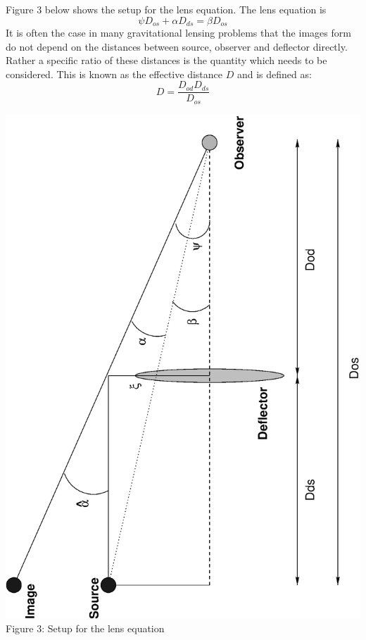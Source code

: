 \documentclass[a4paper]{IEEEtran}
\begin{document}
Figure 3 below shows the setup for the lens equation. The lens
equation is
\begin{equation}
    \psi D_{os} + \alpha D_{ds} = \beta D_{os}
\end{equation}
It is often the case in many gravitational lensing problems that 
the images form do not depend on the distances between source, observer
and deflector directly. Rather a specific ratio of these distances
is the quantity which needs to be considered. This is known as the
effective distance $D$ and is defined as:
\begin{equation}
\label{eq:effd}
    D = \frac{D_{od} D_{ds} }{D_{os}}
\end{equation}
\begin{center}
    \includegraphics[angle=-90,width=\columnwidth]{images/setup.eps}
    \\[1mm]
    Figure 3: Setup for the lens equation
\end{center}
\end{document}
